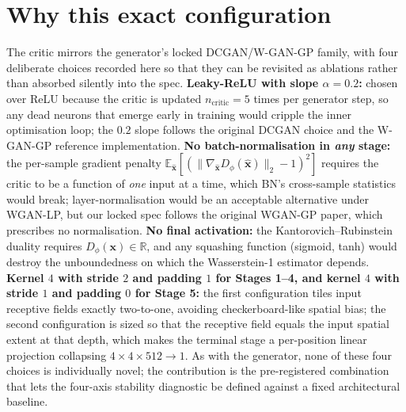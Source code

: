 \section*{Why this exact configuration}

The critic mirrors the generator's locked DCGAN/W-GAN-GP family, with
four deliberate choices recorded here so that they can be revisited as
ablations rather than absorbed silently into the spec.
\textbf{Leaky-ReLU with slope $\alpha = 0.2$:} chosen over ReLU because
the critic is updated $n_{\mathrm{critic}} = 5$ times per generator
step, so any dead neurons that emerge early in training would cripple
the inner optimisation loop; the $0.2$ slope follows the original
DCGAN choice and the W-GAN-GP reference implementation.
\textbf{No batch-normalisation in \emph{any} stage:} the per-sample
gradient penalty
$\mathbb{E}_{\hat{\mathbf{x}}}[(\|\nabla_{\hat{\mathbf{x}}}
D_\phi(\hat{\mathbf{x}})\|_2 - 1)^2]$ requires the critic to be a
function of \emph{one} input at a time, which BN's cross-sample
statistics would break; layer-normalisation would be an acceptable
alternative under WGAN-LP, but our locked spec follows the original
WGAN-GP paper, which prescribes no normalisation. \textbf{No final
activation:} the Kantorovich--Rubinstein duality requires
$D_\phi(\mathbf{x}) \in \mathbb{R}$, and any squashing function
(sigmoid, tanh) would destroy the unboundedness on which the
Wasserstein-1 estimator depends.
\textbf{Kernel $4$ with stride $2$ and padding $1$ for Stages 1--4, and
kernel $4$ with stride $1$ and padding $0$ for Stage 5:} the first
configuration tiles input receptive fields exactly two-to-one, avoiding
checkerboard-like spatial bias; the second configuration is sized so
that the receptive field equals the input spatial extent at that depth,
which makes the terminal stage a per-position linear projection
collapsing $4 \times 4 \times 512 \to 1$. As with the generator, none
of these four choices is individually novel; the contribution is the
pre-registered combination that lets the four-axis stability
diagnostic be defined against a fixed architectural baseline.
